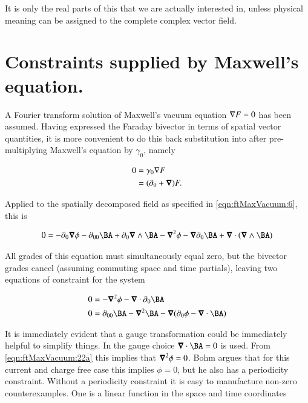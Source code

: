 It is only the real parts of this that we are actually interested in, unless physical meaning can be assigned to the complete complex vector field.

\section{Constraints supplied by Maxwell's equation.}

A Fourier transform solution of Maxwell's vacuum equation $\nabla F = 0$ has been assumed.  Having expressed the Faraday bivector in terms of spatial vector quantities, it is more convenient to do this back substitution into after pre-multiplying Maxwell's equation by $\gamma_0$, namely

\begin{align}
\label{eqn:ftMaxVacuum:20}
0
&= \gamma_0 \nabla F \\
&= (\partial_0 + \boldsymbol{\nabla}) F.
\end{align}

Applied to the spatially decomposed field as specified in \autoref{eqn:ftMaxVacuum:6}, this is

\begin{align*}
0
&=
-\partial_0 \spacegrad \phi
-\partial_{00} \BA
+ \partial_0 \spacegrad \wedge \BA
-\spacegrad^2 \phi
- \spacegrad \partial_0 \BA
+ \spacegrad \cdot (\spacegrad \wedge \BA ) \\
\end{align*}

All grades of this equation must simultaneously equal zero, but the bivector grades cancel (assuming commuting space and time partials), leaving two equations of constraint for the system

\begin{subequations}
\label{eqn:ftMaxVacuum:22}
\begin{align}
0 &=
-\spacegrad^2 \phi - \spacegrad \cdot \partial_0 \BA
\label{eqn:ftMaxVacuum:22a}
\\
0 &=
\partial_{00} \BA - \spacegrad^2 \BA
- \spacegrad (\partial_0 \phi - \spacegrad \cdot \BA )
\label{eqn:ftMaxVacuum:22b}
\end{align}
\end{subequations}

It is immediately evident that a gauge transformation could be immediately helpful to simplify things.  In \cite{bohm1989qt} the gauge choice $\spacegrad \cdot \BA = 0$ is used.  From \autoref{eqn:ftMaxVacuum:22a} this implies that $\boldsymbol{\nabla}^2 \phi = 0$.  Bohm argues that for this current and charge free case this implies $\phi = 0$, but he also has a periodicity constraint.  Without a periodicity constraint it is easy to manufacture non-zero counterexamples.  One is a linear function in the space and time coordinates

